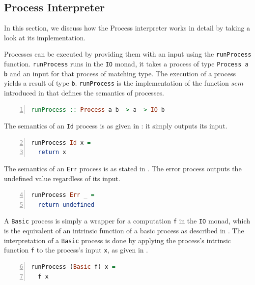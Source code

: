 \subsection{Process Interpreter}
In this section, we discuss how the Process interpreter works in detail by taking a look at its implementation.

Processes can be executed by providing them with an input using the \texttt{runProcess} function. \texttt{runProcess} runs in the \texttt{IO} monad, it takes a process of type \texttt{Process a b} and an input for that process of matching type. The execution of a process yields a result of type \texttt{b}. \texttt{runProcess} is the implementation of the function $sem$ introduced in  that defines the semantics of processes.
\begin{lstlisting}[language=Haskell,caption=Signature of the process interpreter implemented using \textsf{Concurrent Haskell}.,label=lst:local_runprocess_signature,numbers=left,frame=bt]
runProcess :: Process a b -> a -> IO b
\end{lstlisting}

The semantics of an \texttt{Id} process is as given in : it simply outputs its input.
\begin{lstlisting}[language=Haskell,caption=Implementation of the interpreter for \texttt{Id} processes.,label=lst:local_runprocess_const,numbers=left,frame=bt,firstnumber=2]
runProcess Id x =
  return x
\end{lstlisting}

The semantics of an \texttt{Err} process is as stated in . The error process outputs the undefined value regardless of its input.
\begin{lstlisting}[language=Haskell,caption=Implementation of the interpreter for \texttt{Err} processes.,label=lst:local_runprocess_const,numbers=left,frame=bt,firstnumber=4]
runProcess Err _ =
  return undefined
\end{lstlisting}

A \texttt{Basic} process is simply a wrapper for a computation \texttt{f} in the \texttt{IO} monad, which is the equivalent of an intrinsic function of a basic process as described in . The interpretation of a \texttt{Basic} process is done by applying the process's intrinsic function \texttt{f} to the process's input \texttt{x}, as given in .
\begin{lstlisting}[language=Haskell,caption=Implementation of the interpreter for \texttt{Basic} processes.,label=lst:local_runprocess_simple,numbers=left,frame=bt,firstnumber=6]
runProcess (Basic f) x =
  f x
\end{lstlisting}

